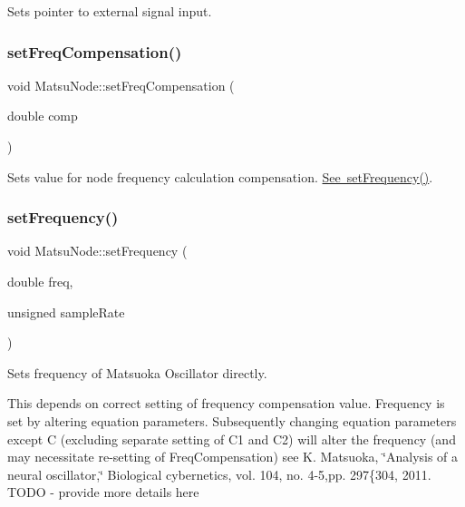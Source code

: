 Sets pointer to external signal input. 

\mbox{\label{classMatsuNode_a800722180d2d170f80fd61e1db151c05}} 
\subsubsection{\texorpdfstring{set\+Freq\+Compensation()}{setFreqCompensation()}}
{\footnotesize\ttfamily void Matsu\+Node\+::set\+Freq\+Compensation (\begin{DoxyParamCaption}\item[{double}]{comp }\end{DoxyParamCaption})}



Sets value for node frequency calculation compensation. \mbox{\hyperlink{classMatsuNode_adb33b1e7dcfaf786be5d99627bca1c14}{See set\+Frequency()}}. 

\mbox{\label{classMatsuNode_adb33b1e7dcfaf786be5d99627bca1c14}} 
\subsubsection{\texorpdfstring{set\+Frequency()}{setFrequency()}}
{\footnotesize\ttfamily void Matsu\+Node\+::set\+Frequency (\begin{DoxyParamCaption}\item[{double}]{freq,  }\item[{unsigned}]{sample\+Rate }\end{DoxyParamCaption})}



Sets frequency of Matsuoka Oscillator directly. 

This depends on correct setting of frequency compensation value. Frequency is set by altering equation parameters. Subsequently changing equation parameters except C (excluding separate setting of C1 and C2) will alter the frequency (and may necessitate re-\/setting of Freq\+Compensation) see K. Matsuoka, \char`\"{}\+Analysis of a neural oscillator,\char`\"{} Biological cybernetics, vol. 104, no. 4-\/5,pp. 297\{304, 2011. T\+O\+DO -\/ provide more details here \mbox{\label{classMatsuNode_aff58c0ee6aaaaa21f3f8ef532728cacc}} 
